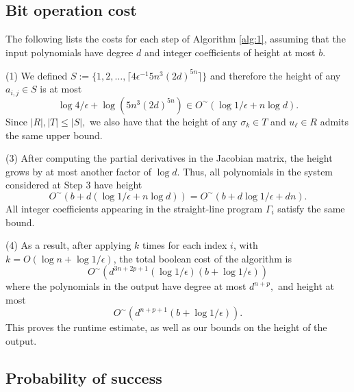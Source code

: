 \documentclass[12pt]{article}
\begin{document}

\subsection{Bit operation cost} 

The following lists the costs for each step of Algorithm \ref{alg:1},
assuming that the input polynomials have degree $d$ and integer
coefficients of height at most $b$.

\smallskip\noindent
(1) We defined $S := \{1,2,\hdots,\lceil 4\epsilon^{-1}5n^3(2d)^{5n} \rceil \}$
and therefore the height of any $a_{i,j} \in S$ is at most
\[
\log 4/{\epsilon} + \log(5n^3(2d)^{5n}) \in O^{\sim}(\log 1/{\epsilon} + n\log d).
\]
Since $|R|, |T| \le |S|,$ we also have that the height of any
$\sigma_{k} \in T$ and $u_{\ell} \in R$ admits the same upper bound.

\smallskip\noindent (3) After computing the partial derivatives in the
Jacobian matrix, the height grows by at most another factor of $\log
d$. Thus, all polynomials in the system considered at Step 3 have
height
\[
O^{\sim}(b + d(\log 1 /
\epsilon + n\log d))
=
O^{\sim}(b + d\log 1 /
\epsilon + dn).
\]
All integer coefficients appearing in the straight-line program
$\Gamma_i$ satisfy the same bound.

\smallskip\noindent (4) As a result, after applying \cite[Algorithm
  2]{SH} $k$ times for each index $i$, with $k = O(\log n + \log 1 /
\epsilon)$, the total boolean cost of the algorithm is
  \[
O^{\sim}(d^{3n+2p+1}(\log1/\epsilon)(b + \log1/\epsilon))
  \]
      where the polynomials in the output have degree at most $d^{n+p},$ and height at most
  \[
O^{\sim}(d^{n+p+1}(b + \log1/\epsilon)).
  \]
This proves the runtime estimate, as well as our bounds on the height
of the output.


\subsection{Probability of success} 
\end{document}
